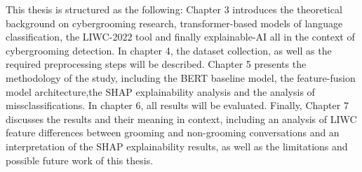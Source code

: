 This thesis is structured as the following: Chapter 3 introduces the theoretical background on cybergrooming research, transformer-based models of language classification, the LIWC-2022 tool and finally explainable-AI all in the context of cybergrooming detection. In chapter 4, the dataset collection, as well as the required preprocessing steps will be described. Chapter 5 presents the methodology of the study, including the BERT baseline model, the feature-fusion model architecture,the SHAP explainability analysis and the analysis of missclassifications. In chapter 6, all results will be evaluated. Finally, Chapter 7 discusses the results and their meaning in context, including an analysis of LIWC feature differences between grooming and non-grooming conversations and an interpretation of the SHAP explainability results, as well as the limitations and possible future work of this thesis.

